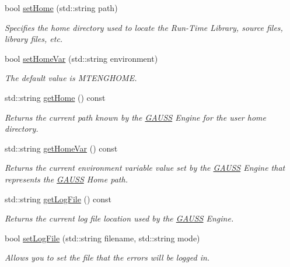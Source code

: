 \begin{DoxyCompactItemize}
bool \hyperlink{class_g_a_u_s_s_ac34645a05f3aca7d56d11d0b895fb33a}{set\+Home} (std\+::string path)
\begin{DoxyCompactList}\small\item\em Specifies the home directory used to locate the Run-\/\+Time Library, source files, library files, etc. \end{DoxyCompactList}\item 
bool \hyperlink{class_g_a_u_s_s_ad2935b18b45d55903bb5025143dffab4}{set\+Home\+Var} (std\+::string environment)
\begin{DoxyCompactList}\small\item\em The default value is {\ttfamily M\+T\+E\+N\+G\+H\+O\+ME}. \end{DoxyCompactList}\item 
std\+::string \hyperlink{class_g_a_u_s_s_a917690c72f22ff82e13c49c5686af1dd}{get\+Home} () const
\begin{DoxyCompactList}\small\item\em Returns the current path known by the \hyperlink{class_g_a_u_s_s}{G\+A\+U\+SS} Engine for the user home directory. \end{DoxyCompactList}\item 
std\+::string \hyperlink{class_g_a_u_s_s_ab8df3c28586620495a09af82e4be9ab5}{get\+Home\+Var} () const
\begin{DoxyCompactList}\small\item\em Returns the current environment variable value set by the \hyperlink{class_g_a_u_s_s}{G\+A\+U\+SS} Engine that represents the \hyperlink{class_g_a_u_s_s}{G\+A\+U\+SS} Home path. \end{DoxyCompactList}\item 
std\+::string \hyperlink{class_g_a_u_s_s_a41c57746753165bfc8b2e71459c6ccde}{get\+Log\+File} () const
\begin{DoxyCompactList}\small\item\em Returns the current log file location used by the \hyperlink{class_g_a_u_s_s}{G\+A\+U\+SS} Engine. \end{DoxyCompactList}\item 
bool \hyperlink{class_g_a_u_s_s_aeec13d5fa3abe9e9b7836cee87edf5b8}{set\+Log\+File} (std\+::string filename, std\+::string mode)
\begin{DoxyCompactList}\small\item\em Allows you to set the file that the errors will be logged in. \end{DoxyCompactList}\item 

\end{DoxyCompactItemize}
